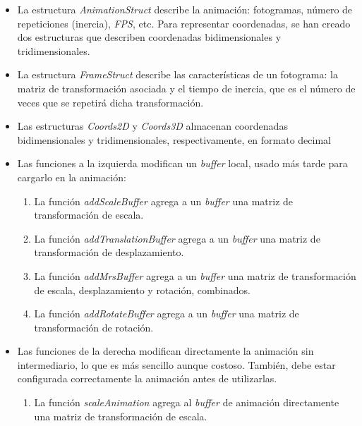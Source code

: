 \begin{itemize}
    \item La estructura \textit{AnimationStruct} describe la animación: fotogramas, número de repeticiones (inercia), \textit{FPS}, etc. Para representar coordenadas, se han creado dos estructuras que describen coordenadas bidimensionales y tridimensionales.

    \item La estructura \textit{FrameStruct} describe las características de un fotograma: la matriz de transformación asociada y el tiempo de inercia, que es el número de veces que se repetirá dicha transformación.

    \item Las estructuras \textit{Coords2D} y \textit{Coords3D} almacenan coordenadas bidimensionales y tridimensionales, respectivamente, en formato decimal
    
    \item Las funciones a la izquierda modifican un \textit{buffer} local, usado más tarde para cargarlo en la animación: 
    
    \begin{enumerate}
        \item La función \textit{addScaleBuffer} agrega a un \textit{buffer} una matriz de transformación de escala.
        
        \item La función \textit{addTranslationBuffer} agrega a un \textit{buffer} una matriz de transformación de desplazamiento.
        
        \item La función \textit{addMrsBuffer} agrega a un \textit{buffer} una matriz de transformación de escala, desplazamiento y rotación, combinados.
        
        \item La función \textit{addRotateBuffer} agrega a un \textit{buffer} una matriz de transformación de rotación.
    \end{enumerate}
    
    \item Las funciones de la derecha modifican directamente la animación sin intermediario, lo que es más sencillo aunque costoso. También, debe estar configurada correctamente la animación antes de utilizarlas.
    
    \begin{enumerate}
        \item La función \textit{scaleAnimation} agrega al \textit{buffer} de animación directamente una matriz de transformación de escala.
        

\end{enumerate}
\end{itemize}
